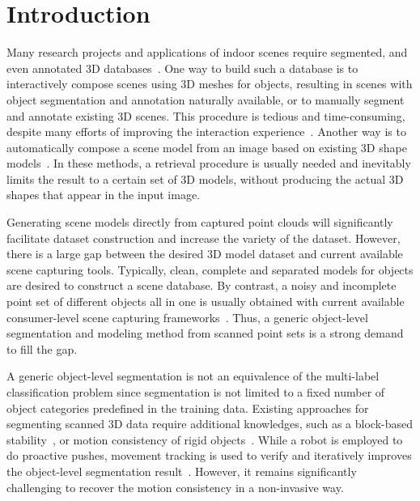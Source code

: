 \section{Introduction}
\label{sec:intro}
Many research projects and applications of indoor scenes require segmented, and even annotated 3D databases~\cite{SearchClassify,SceneFromExample,Fisher:2012:ESO:2366145.2366154,Chen:2014:ASM:2661229.2661239,Fisher:ActivityCentricSceneSynthesis}.
%
One way to build such a database is to interactively compose scenes using 3D meshes for objects, resulting in scenes with object segmentation and annotation naturally available, or to manually segment and annotate existing 3D scenes. This procedure is tedious and time-consuming, despite many efforts of improving the interaction experience~\cite{Merrell:2011:IFL:2010324.1964982, Xu:2013:SSC:2461912.2461968}. 
%
Another way is to automatically compose a scene model from an image based on existing 3D shape models~\cite{Liu2015Model,Chen:2014:ASM:2661229.2661239}.  
In these methods, a retrieval procedure is usually needed and inevitably limits the result to a certain set of 3D models, without producing the actual 3D shapes that appear in the input image.

Generating scene models directly from captured point clouds will significantly facilitate dataset construction and increase the variety of the dataset. 
However, there is a large gap between the desired 3D model dataset and current available scene capturing tools. Typically, clean, complete and separated models for objects are desired to construct a scene database. 
By contrast, a noisy and incomplete point set of different objects all in one is usually obtained with current available consumer-level scene capturing frameworks~\cite{KinectFusion,VXH,dai2016bundlefusion}. 
Thus, a generic object-level segmentation and modeling method from scanned point sets is a strong demand to fill the gap.

A generic object-level segmentation is not an equivalence of the multi-label classification problem since segmentation is not limited to a fixed number of object categories predefined in the training data. 
Existing approaches for segmenting scanned 3D data require additional knowledges, such as a block-based stability~\cite{3DReasoningfromBlockstoStability}, or motion consistency of rigid objects~\cite{Xu:2015:ACS:2816795.2818075}. 
While a robot is employed to do proactive pushes, movement tracking is used to verify and iteratively improves the object-level segmentation result~\cite{Xu:2015:ACS:2816795.2818075}.
However, it remains significantly challenging to recover the motion consistency in a non-invasive way. 

